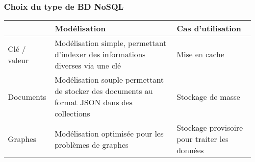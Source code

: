 		\begin{frame}
			\frametitle{Choix du type de BD NoSQL}

			\begin{tabular}{|p{}|p{}|p{}|}
				\hline
				& Modélisation & Cas d'utilisation \\\hline
				Clé / valeur
				& Modélisation simple, permettant d'indexer des informations diverses via une clé
				& Mise en cache  \\\hline
				Documents
				& Modélisation souple permettant de stocker des documents au format JSON dans des collections
				& Stockage de masse \\\hline
				Graphes
				& Modélisation optimisée pour les problèmes de graphes
				& Stockage provisoire pour traiter les données \\\hline
			\end{tabular}
		\end{frame}